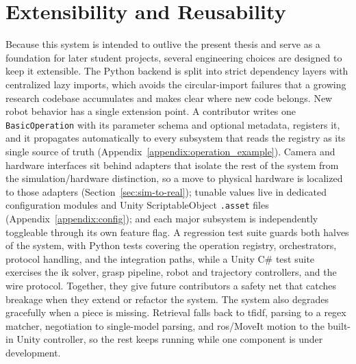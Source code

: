 \section{Extensibility and Reusability}\label{sec:extensibility}
Because this system is intended to outlive the present thesis and serve as a foundation for later student projects, several engineering choices are designed to keep it extensible. The Python backend is split into strict dependency layers with centralized lazy imports, which avoids the circular-import failures that a growing research codebase accumulates and makes clear where new code belongs. New robot behavior has a single extension point. A contributor writes one \texttt{BasicOperation} with its parameter schema and optional metadata, registers it, and it propagates automatically to every subsystem that reads the registry as its single source of truth (Appendix~\ref{appendix:operation_example}). Camera and hardware interfaces sit behind adapters that isolate the rest of the system from the simulation/hardware distinction, so a move to physical hardware is localized to those adapters (Section~\ref{sec:sim-to-real}); tunable values live in dedicated configuration modules and Unity ScriptableObject \texttt{.asset} files (Appendix~\ref{appendix:config}); and each major subsystem is independently toggleable through its own feature flag. A regression test suite guards both halves of the system, with Python tests covering the operation registry, orchestrators, protocol handling, and the integration paths, while a Unity C\# test suite exercises the \gls{ik} solver, grasp pipeline, robot and trajectory controllers, and the wire protocol. Together, they give future contributors a safety net that catches breakage when they extend or refactor the system. The system also degrades gracefully when a piece is missing. Retrieval falls back to \gls{tfidf}, parsing to a regex matcher, negotiation to single-model parsing, and \gls{ros}/MoveIt motion to the built-in Unity controller, so the rest keeps running while one component is under development.